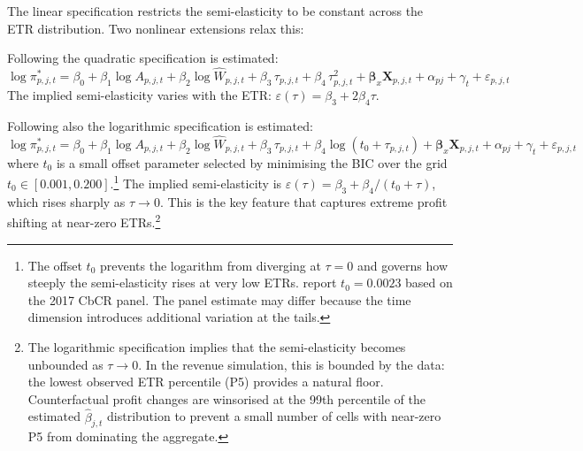 \documentclass[11pt,a4paper]{article}
\begin{document}
The linear specification restricts the semi-elasticity to be constant across the ETR distribution. Two nonlinear extensions relax this:

Following \citet{dowd2017} the quadratic specification is estimated:
\begin{equation}\label{eq:panel_quadratic}
\log \pi_{p,j,t}^{*} = \beta_0 + \beta_1 \log A_{p,j,t} + \beta_2 \log \hat{W}_{p,j,t} + \beta_3 \, \tau_{p,j,t} + \beta_4 \, \tau_{p,j,t}^2 + \mathbf{\beta}_x \mathbf{X}_{p,j,t} + \alpha_{pj} + \gamma_t + \varepsilon_{p,j,t}
\end{equation}
The implied semi-elasticity varies with the ETR: $\varepsilon(\tau) = \beta_3 + 2\beta_4 \tau$.

Following \citet{garcia-bernardo2024} also the logarithmic specification is estimated:
\begin{equation}\label{eq:panel_log}
\log \pi_{p,j,t}^{*} = \beta_0 + \beta_1 \log A_{p,j,t} + \beta_2 \log \hat{W}_{p,j,t} + \beta_3 \, \tau_{p,j,t} + \beta_4 \log(t_0 + \tau_{p,j,t}) + \mathbf{\beta}_x \mathbf{X}_{p,j,t} + \alpha_{pj} + \gamma_t + \varepsilon_{p,j,t}
\end{equation}
where $t_0$ is a small offset parameter selected by minimising the BIC over the grid $t_0 \in [0.001, 0.200]$.\footnote{The offset $t_0$ prevents the logarithm from diverging at $\tau = 0$ and governs how steeply the semi-elasticity rises at very low ETRs. \citet{garcia-bernardo2024} report $t_0 = 0.0023$ based on the 2017 CbCR panel. The panel estimate may differ because the time dimension introduces additional variation at the tails.} The implied semi-elasticity is $\varepsilon(\tau) = \beta_3 + \beta_4 / (t_0 + \tau)$, which rises sharply as $\tau \to 0$. This is the key feature that captures extreme profit shifting at near-zero ETRs.\footnote{The logarithmic specification implies that the semi-elasticity becomes unbounded as $\tau \to 0$. In the revenue simulation, this is bounded by the data: the lowest observed ETR percentile (P5) provides a natural floor. Counterfactual profit changes are winsorised at the 99th percentile of the estimated $\hat{\beta}_{j,t}$ distribution to prevent a small number of cells with near-zero P5 from dominating the aggregate.}
\end{document}
